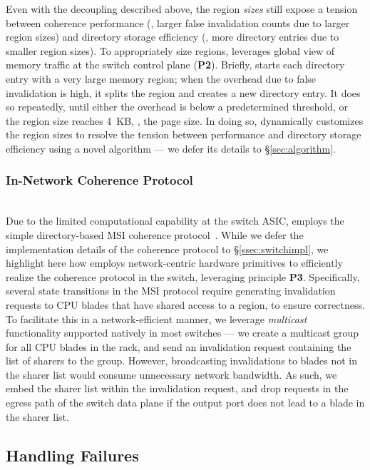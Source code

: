  Even with the decoupling described above, the region \textit{sizes} still expose a tension between coherence performance (\eg, larger false invalidation counts due to larger region sizes) and directory storage efficiency (\eg, more directory entries due to smaller region sizes). To appropriately size regions, \mind leverages global view of memory traffic at the switch control plane (\textbf{P2}). Briefly, \mind starts each directory entry with a very large memory region; when the overhead due to false invalidation is high, it splits the region and creates a new directory entry. It does so repeatedly, until either the overhead is below a predetermined threshold, or the region size reaches $4$~KB, \ie, the page size. In doing so, \mind dynamically customizes the region sizes to resolve the tension between performance and directory storage efficiency using a novel \sizing algorithm --- we defer its details to \S\ref{sec:algorithm}.

\subsubsection{In-Network Coherence Protocol}\label{subsec:cache_dir}\hfill\\
\noindent
Due to the limited computational capability at the switch ASIC, \mind employs the simple directory-based MSI coherence protocol~\cite{msi}. While we defer the implementation details of the coherence protocol to \S\ref{ssec:switchimpl}, we highlight here how \mind employs network-centric hardware primitives to efficiently realize the coherence protocol in the switch, leveraging principle \textbf{P3}. Specifically, several state transitions in the MSI protocol require generating invalidation requests to CPU blades that have shared access to a region, to ensure correctness. To facilitate this in a network-efficient manner, we leverage \textit{multicast} functionality supported natively in most switches --- we create a multicast group for all CPU blades in the rack, and send an invalidation request containing the list of sharers to the group. However, broadcasting invalidations to blades not in the sharer list would consume unnecessary network bandwidth. As such, we embed the sharer list within the invalidation request, and drop requests in the egress path of the switch data plane if the output port does not lead to a blade in the sharer list.

\subsection{Handling Failures}\label{subsec:acking}

